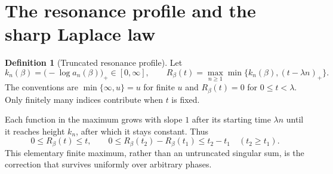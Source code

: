 \documentclass[11pt,a4paper]{article}
\theoremstyle{definition}
\newtheorem{definition}[theorem]{Definition}
\theoremstyle{remark}\newtheorem{remark}[theorem]{Remark}
\begin{document}
\section{The resonance profile and the sharp Laplace law}
\label{sec:profile}

\begin{definition}[Truncated resonance profile]
\label{def:profile}
Let
\begin{equation}
 k_n(\beta)=\bigl(-\log a_n(\beta)\bigr)_+\in[0,\infty],
 \qquad
 R_\beta(t)=\max_{n\ge1}\min\{k_n(\beta),(t-\lambda n)_+\}.
 \label{eq:profiledef}
\end{equation}
The conventions are $\min\{\infty,u\}=u$ for finite $u$ and $R_\beta(t)=0$
for $0\le t<\lambda$.  Only finitely many indices contribute when $t$ is fixed.
\end{definition}

Each function in the maximum grows with slope $1$ after its starting time
$\lambda n$ until it reaches height $k_n$, after which it stays constant.
Thus
\begin{equation}
 0\le R_\beta(t)\le t,\qquad
 0\le R_\beta(t_2)-R_\beta(t_1)\le t_2-t_1
 \quad(t_2\ge t_1).
 \label{eq:Lipschitz}
\end{equation}
This elementary finite maximum, rather than an untruncated singular sum,
is the correction that survives uniformly over arbitrary phases.
\end{document}
